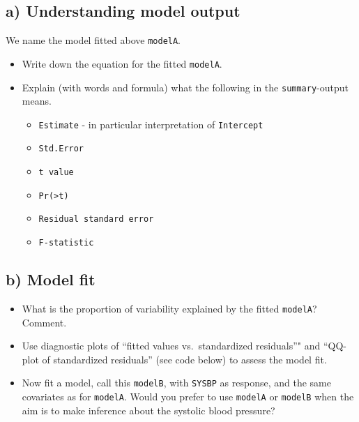 \documentclass[]{article}
\providecommand{\tightlist}{%
  \setlength{\itemsep}{0pt}\setlength{\parskip}{0pt}}
\begin{document}
\hypertarget{a-understanding-model-output}{%
\subsection{a) Understanding model
output}\label{a-understanding-model-output}}

We name the model fitted above \texttt{modelA}.

\begin{itemize}
\tightlist
\item
  Write down the equation for the fitted \texttt{modelA}.
\item
  Explain (with words and formula) what the following in the
  \texttt{summary}-output means.

  \begin{itemize}
  \tightlist
  \item
    \texttt{Estimate} - in particular interpretation of
    \texttt{Intercept}
  \item
    \texttt{Std.Error}
  \item
    \texttt{t\ value}
  \item
    \texttt{Pr(\textgreater{}\textbar{}t\textbar{})}
  \item
    \texttt{Residual\ standard\ error}
  \item
    \texttt{F-statistic}
  \end{itemize}
\end{itemize}

\hypertarget{b-model-fit}{%
\subsection{b) Model fit}\label{b-model-fit}}

\begin{itemize}
\tightlist
\item
  What is the proportion of variability explained by the fitted
  \texttt{modelA}? Comment.
\item
  Use diagnostic plots of ``fitted values vs.~standardized residuals''"
  and ``QQ-plot of standardized residuals'' (see code below) to assess
  the model fit.
\item
  Now fit a model, call this \texttt{modelB}, with \texttt{SYSBP} as
  response, and the same covariates as for \texttt{modelA}. Would you
  prefer to use \texttt{modelA} or \texttt{modelB} when the aim is to
  make inference about the systolic blood pressure?
\end{itemize}
\end{document}

